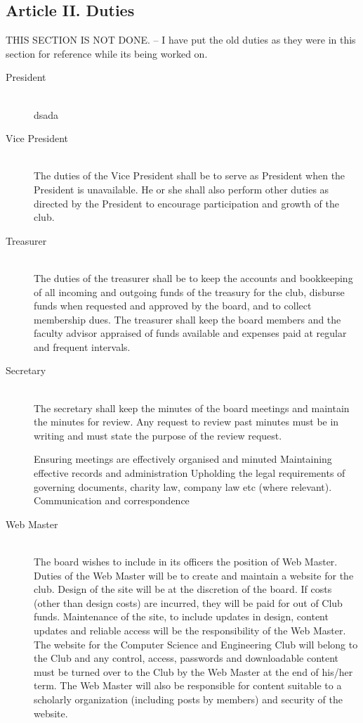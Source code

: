 \documentclass{article}
\begin{document}
  \subsection{Article II. Duties}
    THIS SECTION IS NOT DONE.
        -- I have put the old duties as they were in this section for reference while its being worked on.
    \begin{description}

        \item[President] ~\\
        dsada
        \item[Vice President] ~\\
          The duties of the Vice President shall be to serve as President when the President is unavailable. He or she shall also perform other duties as directed by the President to encourage participation and growth of the club.

        \item[Treasurer] ~\\
          The duties of the treasurer shall be to keep the accounts and bookkeeping of all incoming and outgoing funds of the treasury for the club, disburse funds when requested and approved by the board, and to collect membership dues. The treasurer shall keep the board members and the faculty advisor appraised of funds available and expenses paid at regular and frequent intervals.

        \item[Secretary] ~\\
          The secretary shall keep the minutes of the board meetings and maintain the minutes for review. Any request to review past minutes must be in writing and must state the purpose of the review request.

          Ensuring meetings are effectively organised and minuted
      Maintaining effective records and administration
      Upholding the legal requirements of governing documents, charity law, company law etc (where relevant).
      Communication and correspondence

        \item[Web Master] ~\\
          The board wishes to include in its officers the position of Web Master. Duties of the Web Master will be to create and maintain a website for the club. Design of the site will be at the discretion of the board. If costs (other than design costs) are incurred, they will be paid for out of Club funds. Maintenance of the site, to include updates in design, content updates and reliable access will be the responsibility of the Web Master. The website for the Computer Science and Engineering Club will belong to the Club and any control, access, passwords and downloadable content must be turned over to the Club by the Web Master at the end of his/her term. The Web Master will also be responsible for content suitable to a scholarly organization (including posts by members) and security of the website.


\end{description}
\end{document}
